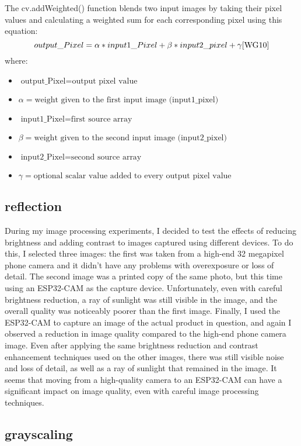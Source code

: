The cv.addWeighted() function blends two input images by taking their pixel values and calculating a weighted sum for each corresponding pixel \cite{WG10} using this equation:\\
\begin{equation}
output\_Pixel = \alpha * input1\_Pixel +\beta * input2\_pixel + \gamma \cite{WG10} 
\end{equation}
where: \\
\begin{itemize}
\item $\text{output\_Pixel} = \text{output pixel value}$
\item $\alpha = \text{weight given to the first input image (input1\_pixel)}$
\item $\text{input1\_Pixel} = \text{first source array}$
\item $\beta = \text{weight given to the second input image (input2\_pixel)}$
\item $\text{input2\_Pixel} = \text{second source array}$
\item $\gamma = \text{optional scalar value added to every output pixel value}$
\end{itemize}
\subsection{reflection}
During my image processing experiments, I decided to test the effects of reducing brightness and adding contrast to images captured using different devices. To do this, I selected three images: the first was taken from a high-end 32 megapixel phone camera and it didn't have any problems with overexposure or loss of detail. The second image was a printed copy of the same photo, but this time using an ESP32-CAM as the capture device. Unfortunately, even with careful brightness reduction, a ray of sunlight was still visible in the image, and the overall quality was noticeably poorer than the first image. Finally, I used the ESP32-CAM to capture an image of the actual product in question, and again I observed a reduction in image quality compared to the high-end phone camera image. Even after applying the same brightness reduction and contrast enhancement techniques used on the other images, there was still visible noise and loss of detail, as well as a ray of sunlight that remained in the image. It seems that moving from a high-quality camera to an ESP32-CAM can have a significant impact on image quality, even with careful image processing techniques.
\subsection{grayscaling}

